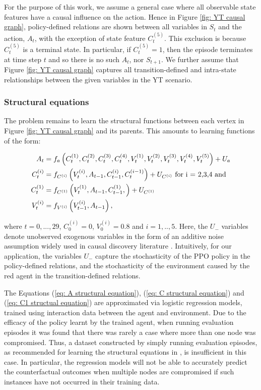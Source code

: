 \documentclass{article}
\begin{document}
\noindent For the purpose of this work, we assume a general case where all observable state features have a causal influence on the action. Hence in Figure \ref{fig: YT causal graph}, policy-defined relations are shown between all variables in $S_t$ and the action, $A_t$, with the exception of state feature $C_t^{(5)}$. This exclusion is because $C_t^{(5)}$ is a terminal state. In particular, if $C_t^{(5)} = 1$, then the episode terminates at time step $t$ and so there is no such $A_t$, nor $S_{t+1}$. We further assume that Figure \ref{fig: YT causal graph} captures all transition-defined and intra-state relationships between the given variables in the YT scenario.

\subsubsection{Structural equations}

The problem remains to learn the structural functions between each vertex in Figure \ref{fig: YT causal graph} and its parents. This amounts to learning functions of the form:

\begin{align}
     A_t &= f_a\left(C_t^{(1)}, C_t^{(2)}, C_t^{(3)}, C_t^{(4)}, V_t^{(1)}, V_t^{(2)}, V_t^{(3)}, V_t^{(4)}, V_t^{(5)}\right) + U_a 
     \label{eq: A structural equation}\\
\label{eq: C structural equation}  
    C_t^{(i)} &= f_{C^{(i)}}\left(V_t^{(i)}, A_{t-1}, C_{t-1}^{(i)}, C_{t}^{(i-1)}\right) + U_{C^{(i)}} \textnormal{ for i = 2,3,4 and } \\
\label{eq: C1 structual equation}
    C_t^{(1)} &= f_{C^{(1)}}\left(V_t^{(1)}, A_{t-1}, C_{t-1}^{(1)}, \right) + U_{C^{(1)}} \\
\label{eq: V structural equation}
    V_t^{(i)} &= f_{V^{(i)}}\left(V_{t-1}^{(i)}, A_{t-1}\right),   
\end{align}

\noindent where $t = 0,...,29$, $C_0^{(i)} = 0$, $V_0^{(i)} = 0.8$ and $i = 1,..,5$. Here, the $U_-$ variables denote unobserved exogenous variables in the form of an additive noise assumption widely used in causal discovery literature \cite{wang2022causal}.  Intuitively, for our application, the variables $U_-$ capture the stochasticity of the PPO policy in the policy-defined relations, and the stochasticity of the environment caused by the red agent in the transition-defined relations. 


The Equations (\ref{eq: A structural equation}), (\ref{eq: C structural equation}) and (\ref{eq: C1 structual equation}) are approximated via logistic regression models, trained using interaction data between the agent and environment. Due to the efficacy of the policy learnt by the trained agent, when running evaluation episodes it was found that there was rarely a case where more than one node was compromised. Thus, a dataset constructed by simply running evaluation episodes, as recommended for learning the structural equations in \cite{wang2022causal}, is insufficient in this case. In particular, the regression models will not be able to accurately predict the counterfactual outcomes when multiple nodes are compromised if such instances have not occurred in their training data.
\end{document}
